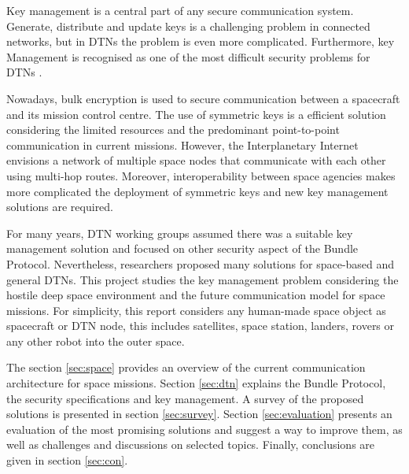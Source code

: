 Key management is a central part of any secure communication system. Generate, distribute and update keys is a challenging problem in connected networks, but in DTNs the problem is even more complicated. Furthermore, key Management is recognised as one of the most difficult security problems for DTNs  \cite{menesidou2017cryptographic}.

Nowadays, bulk encryption is used to secure communication between a spacecraft and its mission control centre. The use of symmetric keys is a efficient solution considering the limited resources and the predominant point-to-point communication in current missions. However, the Interplanetary Internet envisions a network of multiple space nodes that communicate with each other using multi-hop routes.  Moreover, interoperability between space agencies makes more complicated the deployment of symmetric keys and new key management solutions are required.


For many years, DTN working groups assumed there was a suitable key management solution and focused on other security aspect of the Bundle Protocol. Nevertheless, researchers proposed many solutions for space-based and general DTNs. This project studies the key management problem considering the hostile deep space environment and the future communication model for space missions. For simplicity, this report considers any human-made space object as spacecraft or DTN node, this includes satellites, space station, landers, rovers or any other robot into the outer space. 


The section \ref{sec:space} provides an overview of the current communication architecture for space missions. Section \ref{sec:dtn} explains the Bundle Protocol, the security specifications and key management. A survey of the proposed solutions is presented in section \ref{sec:survey}. Section \ref{sec:evaluation} presents an evaluation of the most promising solutions and suggest a way to improve them, as well as challenges and discussions on selected topics. Finally, conclusions are given in section \ref{sec:con}. 




